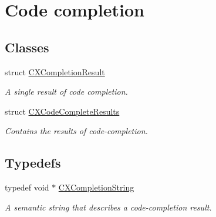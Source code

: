 \hypertarget{group__CINDEX__CODE__COMPLET}{}\section{Code completion}
\label{group__CINDEX__CODE__COMPLET}
\subsection*{Classes}
\begin{DoxyCompactItemize}
\item 
struct \mbox{\hyperlink{structCXCompletionResult}{C\+X\+Completion\+Result}}
\begin{DoxyCompactList}\small\item\em A single result of code completion. \end{DoxyCompactList}\item 
struct \mbox{\hyperlink{structCXCodeCompleteResults}{C\+X\+Code\+Complete\+Results}}
\begin{DoxyCompactList}\small\item\em Contains the results of code-\/completion. \end{DoxyCompactList}\end{DoxyCompactItemize}
\subsection*{Typedefs}
\begin{DoxyCompactItemize}
\item 
typedef void $\ast$ \mbox{\hyperlink{group__CINDEX__CODE__COMPLET_gafea23a43a60ec3b4f3bedccfbb76883a}{C\+X\+Completion\+String}}
\begin{DoxyCompactList}\small\item\em A semantic string that describes a code-\/completion result. \end{DoxyCompactList}\end{DoxyCompactItemize}

